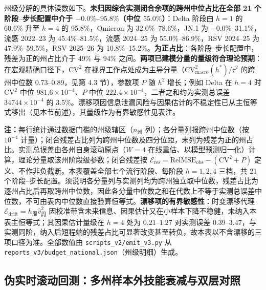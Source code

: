 \documentclass[11pt,a4paper]{article}
\theoremstyle{plain}
\theoremstyle{definition}
\begin{document}
州级分解的具体读数如下。\textbf{未归因综合实测闭合余项的跨州中位占比在全部 21 个阶段--步长配置中介于 $-0.0\%$--$95.8\%$（中位 $55.0\%$）}：Delta 阶段由 $h=1$ 的 60.6\% 升至 $h=4$ 的 95.8\%，Omicron 为 32.0\%--78.6\%，JN.1 为 $-0.0\%$--31.1\%，流感 2022--23 为 45.4\%--81.5\%，流感 2024--25 为 55.0\%--86.9\%，RSV 2024--25 为 47.9\%--59.5\%，RSV 2025--26 为 10.8\%--15.2\%。\textbf{为正占比}：各阶段--步长配置中，残差为正的州占比介于 49\% 与 94\% 之间。\textbf{两项已建模分量的量级符合理论预期}：在宏观精确口径下，$\text{CV}^2$ 在视界工作点处成为主导分量（$\text{CV}^2_{\text{macro}}(h^*)/\tau^2$ 的跨州中位数 0.73--0.89，见第 4.3 节），参数项 $P$ 随 $h^2$ 增长；例如 Delta 在 $h=4$ 时 $\text{CV}^2$ 中位 $981.6\times10^{-4}$、$P$ 中位 $222.4\times10^{-4}$，二者之和约为实测总误差 $34744\times10^{-4}$ 的 3.5\%。漂移项因信息泄漏风险与因果估计的不稳定性已从主恒等式移出（见本节前述），其量级作为有界敏感性见表注。

\begin{table}[htbp]
\centering
\footnotesize
\caption{三项描述性误差记账的州级分解（各分量绝对值 $\times 10^{-4}$ 的中位数与闭合残差占比分布）}
\label{tab:budget_four}
\resizebox{\textwidth}{!}{%
%
}
\vspace{2pt}
\begin{flushleft}
\scriptsize \textbf{注：}每行统计通过数据门槛的州级辖区（$n_{\text{州}}$ 列）；各分量列报跨州中位数（按 $10^{-4}$ 计量）；闭合残差占比列为跨州中位数及四分位距，末列为残差为正的州占比。实测总误差由各州自身滚动原点（$W=4$ 在线重估、以模型预测归一化）计算，理论分量取该州阶段级参数；闭合残差按 $\mathcal{E}_{\text{res}} = \text{RelMSE}_{\text{obs}} - (\text{CV}^2 + P)$ 定义、不作非负截断。本表覆盖全部七个流行阶段、每阶段 $h=1,2,4$ 三档，共 21 个阶段--步长配置。须说明各分量列与实测列均为跨州独立取中位数，残差占比为逐州占比后再取跨州中位数，因此各分量中位数之和在代数上不等于实测总误差中位数，不可由表内中位数直接验算恒等式。\textbf{漂移项的有界敏感性}：时变漂移代理 $\mathcal{E}_{\text{drift}} = h_{\text{周}}\widehat{v}^2_{\text{周}}$ 因校准带含未来信息、因果估计又在小样本下降不稳健，未纳入本表主恒等式；其因果估计量级在 $h=4$ 处为 $0.21$--$1.27$ 对实测误差 $0.39$--$3.47$，与实测同阶，纳入后短程端的残差占比可显著改变甚至转负，故本表以不含漂移的三项口径为准。全部数值由 \texttt{scripts\_v2/emit\_v3.py} 从 \texttt{reports\_v3/budget\_national.json}（州级明细）生成。\end{flushleft}
\end{table}

\subsection{伪实时滚动回测：多州样本外技能衰减与双层对照}\label{sec:rolling_eval}
\end{document}
